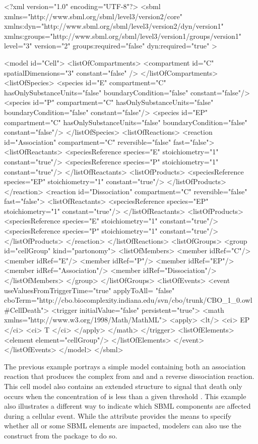 \begin{example}
<?xml version="1.0" encoding="UTF-8"?>
<sbml xmlns="http://www.sbml.org/sbml/level3/version2/core" 
      xmlns:dyn="http://www.sbml.org/sbml/level3/version2/dyn/version1" 
      xmlns:groups="http://www.sbml.org/sbml/level3/version1/groups/version1"
      level="3" version="2" groups:required="false" dyn:required="true" >

	<model id="Cell">
		<listOfCompartments>
			<compartment id="C" spatialDimensions="3" constant="false" />
		</listOfCompartments>
		<listOfSpecies>
			<species id="E" compartment="C" hasOnlySubstanceUnits="false" 
			         boundaryCondition="false" constant="false"/>
			<species id="P" compartment="C" hasOnlySubstanceUnits="false" 
			         boundaryCondition="false" constant="false"/>
			<species id="EP" compartment="C" hasOnlySubstanceUnits="false" 
			         boundaryCondition="false" constant="false"/>
		</listOfSpecies>
		<listOfReactions>
			<reaction id="Association" compartment="C" reversible="false" fast="false">
				<listOfReactants>
					<speciesReference species="E" stoichiometry="1" constant="true"/>
					<speciesReference species="P" stoichiometry="1" constant="true"/>
				</listOfReactants>
				<listOfProducts>
					<speciesReference species="EP" stoichiometry="1" constant="true"/>
				</listOfProducts>
			</reaction>
			<reaction id="Dissociation" compartment="C" reversible="false" fast="false">
				<listOfReactants>
					<speciesReference species="EP" stoichiometry="1" constant="true"/>
				</listOfReactants>
				<listOfProducts>
					<speciesReference species="E" stoichiometry="1" constant="true"/>
					<speciesReference species="P" stoichiometry="1" constant="true"/>
				</listOfProducts>
			</reaction>
		</listOfReactions>
		<listOfGroups>
			<group id="cellGroup" kind="partonomy">
				<listOfMembers>
					<member idRef="C"/>
					<member idRef="E"/>
					<member idRef="P"/>
					<member idRef="EP"/>
					<member idRef="Association"/>
					<member idRef="Dissociation"/>
				</listOfMembers>
			</group>	
		</listOfGroups>
		<listOfEvents>
			<event useValuesFromTriggerTime="true" applyToAll= "false" 
			cboTerm="http://cbo.biocomplexity.indiana.edu/svn/cbo/trunk/CBO_1_0.owl#CellDeath">
				<trigger initialValue="false" persistent="true">
					<math xmlns="http://www.w3.org/1998/Math/MathML">
						<apply> <lt/> <ci> EP </ci> <ci> T </ci> </apply>
					</math>
				</trigger>
				<listOfElements>
					<element element="cellGroup"/>
				</listOfElements>
			</event>
		</listOfEvents>
	</model>
</sbml>
\end{example}

The previous example portrays a simple model containing both an association reaction that produces the complex  from  and  and a reverse dissociation reaction. This cell model also contains an extended \Event structure to signal that death only occurs when the concentration of  is less than a given threshold . This example also illustrates a different way to indicate which SBML components are affected during a cellular event. While the  attribute provides the means to specify whether all or some SBML elements are impacted, modelers can also use the \ListofGroups construct from the  package to do so.